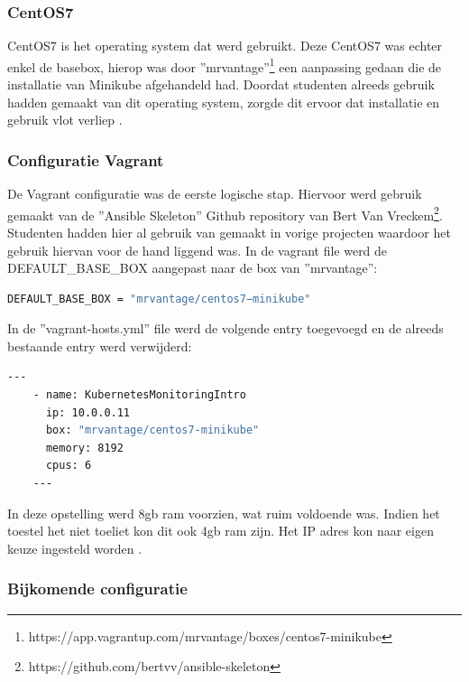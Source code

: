 \subsubsection{CentOS7}

CentOS7 is het operating system dat werd gebruikt. Deze CentOS7 was echter enkel de basebox, hierop was door ''mrvantage''\footnote{https://app.vagrantup.com/mrvantage/boxes/centos7-minikube} een aanpassing gedaan die de installatie van Minikube afgehandeld had. Doordat studenten alreeds gebruik hadden gemaakt van dit operating system, zorgde dit ervoor dat installatie en gebruik vlot verliep \autocite{Cedric2019}. 

\subsubsection{Configuratie Vagrant}

De Vagrant configuratie was de eerste logische stap. Hiervoor werd gebruik gemaakt van de ''Ansible Skeleton'' Github repository van Bert Van Vreckem\footnote{https://github.com/bertvv/ansible-skeleton}. Studenten hadden hier al gebruik van gemaakt in vorige projecten waardoor het gebruik hiervan voor de hand liggend was. In de vagrant file werd de DEFAULT\_BASE\_BOX aangepast naar de box van ''mrvantage'': 

\begin{lstlisting}[language=bash,caption={vagrantfile}]
DEFAULT_BASE_BOX = "mrvantage/centos7−minikube"
\end{lstlisting}

\clearpage
In de ''vagrant-hosts.yml'' file werd de volgende entry toegevoegd en de alreeds bestaande entry werd verwijderd:

\begin{lstlisting}[language=bash,caption={vagrant-hosts.yml}]
    ---
    - name: KubernetesMonitoringIntro
      ip: 10.0.0.11
      box: "mrvantage/centos7-minikube"
      memory: 8192
      cpus: 6
    ---
\end{lstlisting}

In deze opstelling werd 8gb ram voorzien, wat ruim voldoende was. Indien het toestel het niet toeliet kon dit ook 4gb ram zijn. Het IP adres kon naar eigen keuze ingesteld worden \autocite{Cedric2019}. 

\subsubsection{Bijkomende configuratie}

